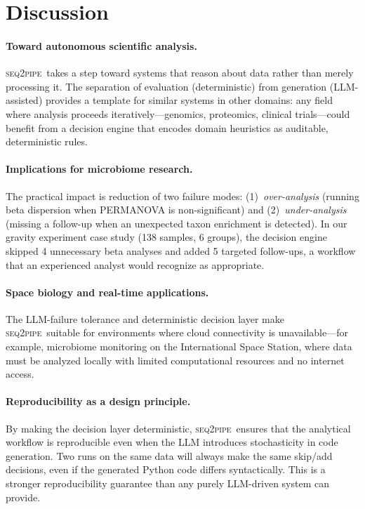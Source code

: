 \documentclass[11pt,a4paper]{article}
\newcommand{\seqpipe}{\textsc{seq2pipe}}
\begin{document}
\section{Discussion}
\label{sec:discussion}

\paragraph{Toward autonomous scientific analysis.}
\seqpipe\ takes a step toward systems that reason about data rather
than merely processing it.
The separation of evaluation (deterministic) from generation
(LLM-assisted) provides a template for similar systems in other
domains: any field where analysis proceeds iteratively---genomics,
proteomics, clinical trials---could benefit from a decision engine
that encodes domain heuristics as auditable, deterministic rules.

\paragraph{Implications for microbiome research.}
The practical impact is reduction of two failure modes:
(1)~\emph{over-analysis} (running beta dispersion when PERMANOVA is
non-significant) and (2)~\emph{under-analysis} (missing a follow-up
when an unexpected taxon enrichment is detected).
In our gravity experiment case study (138 samples, 6 groups),
the decision engine skipped 4 unnecessary beta analyses and added
5 targeted follow-ups, a workflow that an experienced analyst would
recognize as appropriate.

\paragraph{Space biology and real-time applications.}
The LLM-failure tolerance and deterministic decision layer make
\seqpipe\ suitable for environments where cloud connectivity is
unavailable---for example, microbiome monitoring on the International
Space Station, where data must be analyzed locally with limited
computational resources and no internet access.

\paragraph{Reproducibility as a design principle.}
By making the decision layer deterministic, \seqpipe\ ensures that
the analytical workflow is reproducible even when the LLM introduces
stochasticity in code generation.
Two runs on the same data will always make the same skip/add decisions,
even if the generated Python code differs syntactically.
This is a stronger reproducibility guarantee than any purely
LLM-driven system can provide.
\end{document}

